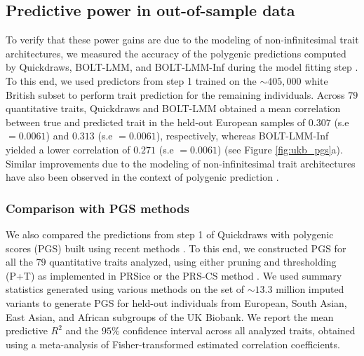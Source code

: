 \clearpage

\subsection{Predictive power in out-of-sample data}

To verify that these power gains are due to the modeling of non-infinitesimal trait architectures, we measured the accuracy of the polygenic predictions computed by Quickdraws, BOLT-LMM, and BOLT-LMM-Inf during the model fitting step \cite{loh2015efficient,loh2018mixed}.
%
To this end, we used predictors from step 1 trained on the ${\sim}405{,}000$ white British subset to perform trait prediction for the remaining individuals.
%
Across $79$ quantitative traits, Quickdraws and BOLT-LMM obtained a mean correlation between true and predicted trait in the held-out European samples of $0.307$ (s.e $= 0.0061$) and $0.313$ (s.e $= 0.0061$), respectively, whereas BOLT-LMM-Inf yielded a lower correlation of $0.271$ (s.e $= 0.0061$) (see Figure \ref{fig:ukb_pgs}a).
%
Similar improvements due to the modeling of non-infinitesimal trait architectures have also been observed in the context of polygenic prediction \cite{vilhjalmsson2015modeling,loh2015efficient,loh2018mixed,lloyd2019improved,prive2020ldpred2}.
%

\subsubsection{Comparison with PGS methods}

We also compared the predictions from step 1 of Quickdraws with polygenic scores (PGS) built using recent methods \cite{euesden2015prsice, ge2019polygenic}.
%
To this end, we constructed PGS for all the $79$ quantitative traits analyzed, using either pruning and thresholding (P+T) as implemented in PRSice \cite{euesden2015prsice} or the PRS-CS method \cite{ge2019polygenic}.
%
We used summary statistics generated using various methods on the set of ${\sim}13.3$ million imputed variants to generate PGS for held-out individuals from European, South Asian, East Asian, and African subgroups of the UK Biobank.
%
We report the mean predictive $R^2$ and the $95\%$ confidence interval across all analyzed traits, obtained using a meta-analysis of Fisher-transformed estimated correlation coefficients.

